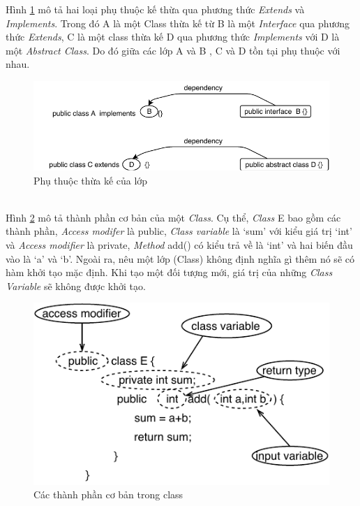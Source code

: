 \documentclass[12pt]{report}
\begin{document}
\noindent Hình \ref{fig:dependecy_extend} mô tả hai loại phụ thuộc kế thừa qua phương thức \textit{Extends} và \textit{Implements}. Trong đó A là một Class thừa kế từ B là một \textit{Interface} qua phương thức \textit{Extends}, C là một class thừa kế D qua phương thức \textit{Implements} với D là một \textit{Abstract Class}. Do đó giữa các lớp A và B , C và D tồn tại phụ thuộc với nhau.\\
\begin{figure}[!htbp]
	\centering
	\vspace{-1cm}
	\includegraphics[scale=1.2]{images/class_dependency.pdf}
	\caption{Phụ thuộc thừa kế của lớp}
	\label{fig:dependecy_extend}
\end{figure}
\\
Hình \ref{fig:class_structure} mô tả thành phần cơ bản của một \textit{Class}. Cụ thể, 
\textit{Class} E bao gồm các thành phần, \textit{Access modifer} là public, \textit{Class variable} là `sum' với kiểu giá trị `int' và \textit{Access modifier} là private, \textit{Method} add() có kiểu trả về là `int' và hai biến đầu vào là `a' và `b'. Ngoài ra, nêu một lớp (Class) không định nghĩa gì thêm nó sẽ có hàm khởi tạo mặc định. Khi tạo một đối tượng mới, giá trị của những \textit{Class Variable} sẽ không được khởi tạo.\\
\begin{figure}[!htbp]
	\centering
	\includegraphics[scale=1.2]{images/class_method_structure.pdf}
	\caption{Các thành phần cơ bản trong class}
	\label{fig:class_structure}
\end{figure}
\end{document}

